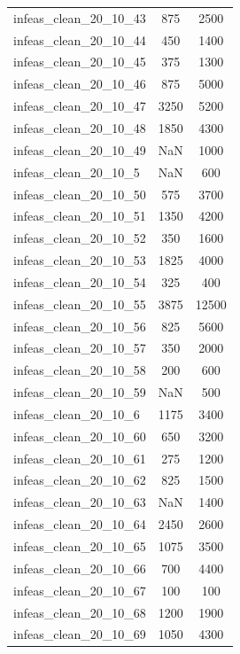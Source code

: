 \begin{longtable}{lcc}
infeas\_clean\_20\_10\_43  &      875 &   2500 \\
infeas\_clean\_20\_10\_44  &      450 &   1400 \\
infeas\_clean\_20\_10\_45  &      375 &   1300 \\
infeas\_clean\_20\_10\_46  &      875 &   5000 \\
infeas\_clean\_20\_10\_47  &     3250 &   5200 \\
infeas\_clean\_20\_10\_48  &     1850 &   4300 \\
infeas\_clean\_20\_10\_49  &      NaN &   1000 \\
infeas\_clean\_20\_10\_5   &      NaN &    600 \\
infeas\_clean\_20\_10\_50  &      575 &   3700 \\
infeas\_clean\_20\_10\_51  &     1350 &   4200 \\
infeas\_clean\_20\_10\_52  &      350 &   1600 \\
infeas\_clean\_20\_10\_53  &     1825 &   4000 \\
infeas\_clean\_20\_10\_54  &      325 &    400 \\
infeas\_clean\_20\_10\_55  &     3875 &  12500 \\
infeas\_clean\_20\_10\_56  &      825 &   5600 \\
infeas\_clean\_20\_10\_57  &      350 &   2000 \\
infeas\_clean\_20\_10\_58  &      200 &    600 \\
infeas\_clean\_20\_10\_59  &      NaN &    500 \\
infeas\_clean\_20\_10\_6   &     1175 &   3400 \\
infeas\_clean\_20\_10\_60  &      650 &   3200 \\
infeas\_clean\_20\_10\_61  &      275 &   1200 \\
infeas\_clean\_20\_10\_62  &      825 &   1500 \\
infeas\_clean\_20\_10\_63  &      NaN &   1400 \\
infeas\_clean\_20\_10\_64  &     2450 &   2600 \\
infeas\_clean\_20\_10\_65  &     1075 &   3500 \\
infeas\_clean\_20\_10\_66  &      700 &   4400 \\
infeas\_clean\_20\_10\_67  &      100 &    100 \\
infeas\_clean\_20\_10\_68  &     1200 &   1900 \\
infeas\_clean\_20\_10\_69  &     1050 &   4300 \\

\end{longtable}
